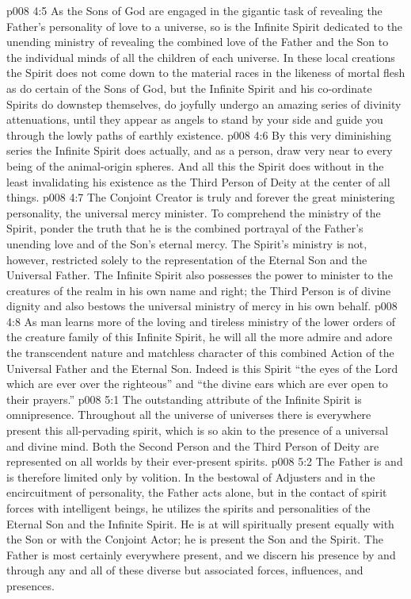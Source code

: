 \vs p008 4:5 As the Sons of God are engaged in the gigantic task of revealing the Father’s personality of love to a universe, so is the Infinite Spirit dedicated to the unending ministry of revealing the combined love of the Father and the Son to the individual minds of all the children of each universe. In these local creations the Spirit does not come down to the material races in the likeness of mortal flesh as do certain of the Sons of God, but the Infinite Spirit and his co\hyp{}ordinate Spirits do downstep themselves, do joyfully undergo an amazing series of divinity attenuations, until they appear as angels to stand by your side and guide you through the lowly paths of earthly existence.
\vs p008 4:6 By this very diminishing series the Infinite Spirit does actually, and as a person, draw very near to every being of the animal\hyp{}origin spheres. And all this the Spirit does without in the least invalidating his existence as the Third Person of Deity at the center of all things.
\pc \vs p008 4:7 The Conjoint Creator is truly and forever the great ministering personality, the universal mercy minister. To comprehend the ministry of the Spirit, ponder the truth that he is the combined portrayal of the Father’s unending love and of the Son’s eternal mercy. The Spirit’s ministry is not, however, restricted solely to the representation of the Eternal Son and the Universal Father. The Infinite Spirit also possesses the power to minister to the creatures of the realm in his own name and right; the Third Person is of divine dignity and also bestows the universal ministry of mercy in his own behalf.\plusone
\vs p008 4:8 As man learns more of the loving and tireless ministry of the lower orders of the creature family of this Infinite Spirit, he will all the more admire and adore the transcendent nature and matchless character of this combined Action of the Universal Father and the Eternal Son. Indeed is this Spirit “the eyes of the Lord which are ever over the righteous” and “the divine ears which are ever open to their prayers.”
\vs p008 5:1 The outstanding attribute of the Infinite Spirit is omnipresence. Throughout all the universe of universes there is everywhere present this all\hyp{}pervading spirit, which is so akin to the presence of a universal and divine mind. Both the Second Person and the Third Person of Deity are represented on all worlds by their ever\hyp{}present spirits.
\vs p008 5:2 The Father is  and is therefore limited only by volition. In the bestowal of Adjusters and in the encircuitment of personality, the Father acts alone, but in the contact of spirit forces with intelligent beings, he utilizes the spirits and personalities of the Eternal Son and the Infinite Spirit. He is at will spiritually present equally with the Son or with the Conjoint Actor; he is present  the Son and  the Spirit. The Father is most certainly everywhere present, and we discern his presence by and through any and all of these diverse but associated forces, influences, and presences.
